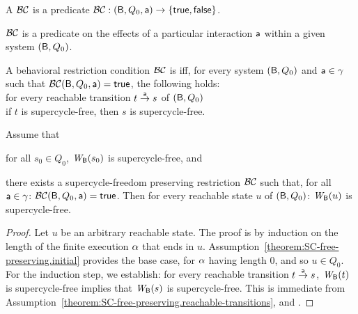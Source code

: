 

\begin{definition}
A  $\BC$ is a predicate
$\BC: (\B, Q_0, \act) \to \set{\ttt, \fff}$.
\end{definition}
%
$\BC$ is a predicate on the effects of a particular interaction $\act$ within a given system
$(\B, Q_0)$.

\begin{definition} \label{def:SC-free-preserving} \label{defn:SC-free-preserving}
A behavioral restriction condition $\BC$ is  iff, for every system 
$(\B, Q_0)$ and $\act \in \gamma$ such that $\BC(\B, Q_0, \act) = \ttt$, the following holds:\\%
%
\ind \ind for every reachable transition $t \goesto[\act] s$ of $(\B, Q_0)$\\
\ind \ind \ind if $t$ is supercycle-free, then $s$ is supercycle-free.
\end{definition}


\begin{theorem}
\label{theorem:SC-free-preserving.deadlock-free}
\label{thm:SC-free-preserving.deadlock-free}
Assume that
\bn
\item \label{theorem:SC-free-preserving.initial}
      for all $s_0 \in Q_0$, $\wfg{\B}{s_0}$ is supercycle-free, and
\item \label{theorem:SC-free-preserving.reachable-transitions}
   there exists a supercycle-freedom preserving restriction $\BC$ such that,
   for all $\act \in \gamma$: $\BC(\B, Q_0, \act) = \ttt$. 
\en
Then for every reachable state $u$ of $(\B, Q_0)$:  $\wfg{\B}{u}$ is supercycle-free.
\end{theorem}
%
\begin{proof} Let $u$ be an arbitrary reachable state. The proof is by induction on the length of the finite
execution $\al$ that ends in $u$.  Assumption~\ref{theorem:SC-free-preserving.initial} provides the
base case, for $\al$ having length 0, and so $u \in Q_0$.  For the induction step, we establish: for
every reachable transition $t \la{\act} s$, $\wfg{\B}{t}$ is supercycle-free implies that
$\wfg{\B}{s}$ is supercycle-free. This is immediate from
Assumption~\ref{theorem:SC-free-preserving.reachable-transitions}, and
. 
\end{proof}

